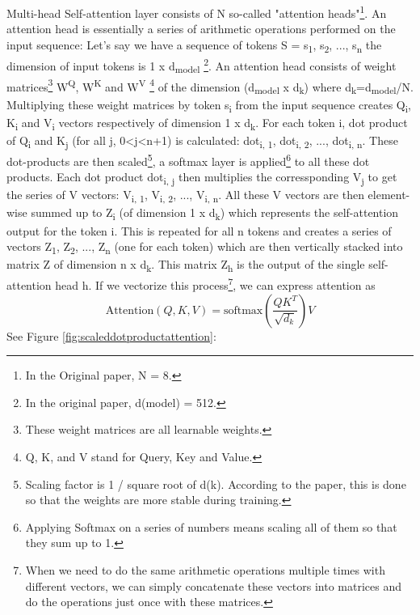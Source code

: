 Multi-head Self-attention layer consists of N so-called "attention heads"\footnote{In the Original paper, N = 8.}. An attention head is essentially a series of arithmetic operations performed on the input sequence: Let's say we have a sequence of tokens S = {s\textsubscript{1}, s\textsubscript{2}, ..., s\textsubscript{n}} the dimension of input tokens is 1 x d\textsubscript{model} \footnote{In the original paper, d(model) = 512.}. An attention head consists of weight matrices\footnote{These weight matrices are all learnable weights.} W\textsuperscript{Q}, W\textsuperscript{K} and W\textsuperscript{V} \footnote{Q, K, and V stand for Query, Key and Value.} of the dimension (d\textsubscript{model} x d\textsubscript{k}) where d\textsubscript{k}=d\textsubscript{model}/N. Multiplying these weight matrices by token s\textsubscript{i} from the input sequence creates Q\textsubscript{i}, K\textsubscript{i} and V\textsubscript{i} vectors respectively of dimension 1 x d\textsubscript{k}. For each token i, dot product of Q\textsubscript{i} and K\textsubscript{j} (for all j, 0<j<n+1) is calculated: dot\textsubscript{i, 1}, dot\textsubscript{i, 2}, ..., dot\textsubscript{i, n}. These dot-products are then scaled\footnote{Scaling factor is 1 / square root of d(k). According to the paper, this is done so that the weights are more stable during training.}, a softmax layer is applied\footnote{Applying Softmax on a series of numbers means scaling all of them so that they sum up to 1.} to all these dot products. Each dot product dot\textsubscript{i, j} then multiplies the corressponding V\textsubscript{j} to get the series of V vectors: V\textsubscript{i, 1}, V\textsubscript{i, 2}, ..., V\textsubscript{i, n}. All these V vectors are then element-wise summed up to Z\textsubscript{i} (of dimension 1 x d\textsubscript{k}) which represents the self-attention output for the token i. This is repeated for all n tokens and creates a series of vectors Z\textsubscript{1}, Z\textsubscript{2}, ..., Z\textsubscript{n} (one for each token) which are then vertically stacked into matrix Z of dimension n x d\textsubscript{k}. This matrix Z\textsubscript{h} is the output of the single self-attention head h. If we vectorize this process\footnote{When we need to do the same arithmetic operations multiple times with different vectors, we can simply concatenate these vectors into matrices and do the operations just once with these matrices.}, we can express attention as \[\text{Attention}(Q, K, V) = \text{softmax}\left(\frac{QK^T}{\sqrt{d_k}}\right) V\]
 See Figure \ref{fig:scaleddotproductattention}:

